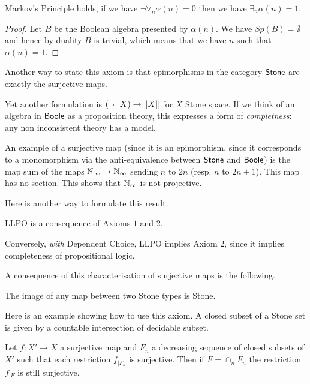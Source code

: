 \begin{proposition}\label{PropMarkov}
Markov's Principle holds, if we have $\neg \forall_n\alpha(n) = 0$ then we have $\exists_n \alpha(n) = 1$.
\end{proposition}

\begin{proof}
  Let $B$ be the Boolean algebra presented by $\alpha(n)$. We have $Sp(B) = \emptyset$ and hence by duality
  $B$ is trivial, which means that we have $n$ such that $\alpha(n) = 1$.
\end{proof}


Another way to state this axiom is that epimorphisms in the category $\mathsf{Stone}$ are exactly the surjective maps.

Yet another formulation is $(\neg \neg X)\rightarrow \lVert X \rVert$ for $X$ Stone space. If we think of an algebra
in $\mathsf{Boole}$ as a proposition theory, this expresses a form of {\em completness}: any non inconsistent theory has
a model. 

\medskip

An example of a surjective map (since it is an epimorphism, since it corresponds to a monomorphism via the anti-equivalence
between $\mathsf{Stone}$ and $\mathsf{Boole}$) is the map sum of the maps $\mathbb{N}_{\infty}\rightarrow \mathbb{N}_{\infty}$ sending $n$ to $2n$ (resp. $n$ to $2n+1$).
This map has no section. This shows that $\mathbb{N}_{\infty}$ is not projective.

Here is another way to formulate this result.

\begin{proposition}
  LLPO is a consequence of Axioms $1$ and $2$.
\end{proposition}

Conversely, {\em with} Dependent Choice, LLPO implies Axiom 2, since it implies completeness of propositional logic.


A consequence of this characterisation of surjective maps is the following.

\begin{proposition}
  The image of any map between two Stone types is Stone.
\end{proposition}

Here is an example showing how to use this axiom. A closed subset of a Stone set is given by a countable
intersection of decidable subset.

\begin{proposition}
  Let $f:X'\rightarrow X$ a surjective map and $F_n$ a decreasing sequence of closed subsets of $X'$ such that
  each restriction $f_{|F_n}$ is surjective. Then if $F = \cap_n F_n$ the restriction $f_{|F}$ is still surjective.
\end{proposition}

